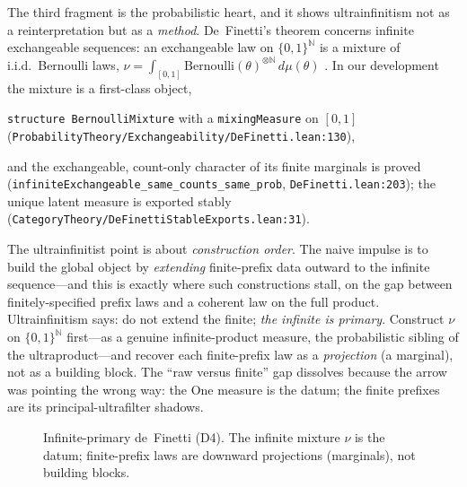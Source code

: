 \documentclass[]{article}
\theoremstyle{definition}
\theoremstyle{remark}
\newcommand{\code}[1]{\texttt{#1}}
\newcommand{\lpath}[1]{{\ttfamily\nolinkurl{#1}}}
\newcommand{\N}{\mathbb{N}}
\begin{document}
The third fragment is the probabilistic heart, and it shows ultrainfinitism not as
a reinterpretation but as a \emph{method}. De~Finetti's theorem concerns infinite
exchangeable sequences: an exchangeable law on $\{0,1\}^{\N}$ is a mixture of
i.i.d.\ Bernoulli laws, $\nu=\int_{[0,1]}\mathrm{Bernoulli}(\theta)^{\otimes\N}\,
d\mu(\theta)$ \cite{definetti1937, deFinetti1974}. In our development the mixture
is a first-class object,
\begin{center}
\code{structure BernoulliMixture} with a \code{mixingMeasure} on $[0,1]$
\quad(\lpath{ProbabilityTheory/Exchangeability/DeFinetti.lean:130}),
\end{center}
and the exchangeable, count-only character of its finite marginals is proved
(\code{infiniteExchangeable\_same\_counts\_same\_prob},
\lpath{DeFinetti.lean:203}); the unique latent measure is exported stably
(\lpath{CategoryTheory/DeFinettiStableExports.lean:31}).

The ultrainfinitist point is about \emph{construction order}. The naive impulse is
to build the global object by \emph{extending} finite-prefix data outward to the
infinite sequence---and this is exactly where such constructions stall, on the gap
between finitely-specified prefix laws and a coherent law on the full product.
Ultrainfinitism says: do not extend the finite; \emph{the infinite is primary}.
Construct $\nu$ on $\{0,1\}^{\N}$ first---as a genuine infinite-product measure,
the probabilistic sibling of the ultraproduct---and recover each finite-prefix law
as a \emph{projection} (a marginal), not as a building block. The ``raw versus
finite'' gap dissolves because the arrow was pointing the wrong way: the One
measure is the datum; the finite prefixes are its principal-ultrafilter shadows.

\begin{figure}[H]
\centering
{}
\caption{Infinite-primary de~Finetti (D4). The infinite mixture $\nu$ is the datum;
finite-prefix laws are downward projections (marginals), not building blocks.}
\label{fig:definetti}
\end{figure}
\end{document}
